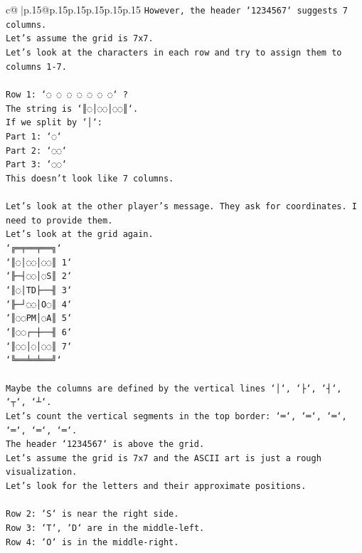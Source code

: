 \documentclass{article}
\begin{document}
{\begin{supertabular}{c@{$\;$}|p{.15\linewidth}@{}p{.15\linewidth}p{.15\linewidth}p{.15\linewidth}p{.15\linewidth}p{.15\linewidth}}
{{{\texttt{However, the header `1234567` suggests 7 columns.} \\
\texttt{Let's assume the grid is 7x7.} \\
\texttt{Let's look at the characters in each row and try to assign them to columns 1{-}7.} \\
\\ 
\texttt{Row 1: `◌ ◌ ◌ ◌ ◌ ◌ ◌` ?} \\
\texttt{The string is `║◌│◌◌│◌◌║`.} \\
\texttt{If we split by `│`:} \\
\texttt{Part 1: `◌`} \\
\texttt{Part 2: `◌◌`} \\
\texttt{Part 3: `◌◌`} \\
\texttt{This doesn't look like 7 columns.} \\
\\ 
\texttt{Let's look at the other player's message. They ask for coordinates. I need to provide them.} \\
\texttt{Let's look at the grid again.} \\
\texttt{`╔═╤══╤══╗`} \\
\texttt{`║◌│◌◌│◌◌║ 1`} \\
\texttt{`╟─┤◌◌│◌S║ 2`} \\
\texttt{`║◌│TD├──╢ 3`} \\
\texttt{`╟─┘◌◌│O◌║ 4`} \\
\texttt{`║◌◌PM│◌A║ 5`} \\
\texttt{`║◌◌┌─┼──╢ 6`} \\
\texttt{`║◌◌│◌│◌◌║ 7`} \\
\texttt{`╚══╧═╧══╝`} \\
\\ 
\texttt{Maybe the columns are defined by the vertical lines `│`, `├`, `┤`, `┬`, `┴`.} \\
\texttt{Let's count the vertical segments in the top border: `═`, `═`, `═`, `═`, `═`, `═`.} \\
\texttt{The header `1234567` is above the grid.} \\
\texttt{Let's assume the grid is 7x7 and the ASCII art is just a rough visualization.} \\
\texttt{Let's look for the letters and their approximate positions.} \\
\\ 
\texttt{Row 2: `S` is near the right side.} \\
\texttt{Row 3: `T`, `D` are in the middle{-}left.} \\
\texttt{Row 4: `O` is in the middle{-}right.} \\
}}}
\end{supertabular}}
\end{document}
